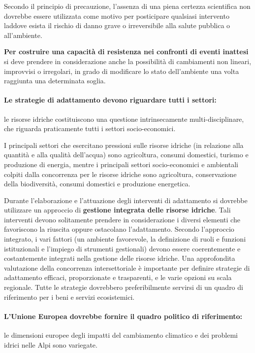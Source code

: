 \documentclass[14pt,a4paper]{article}
\begin{document}
		Secondo il principio di precauzione, l'assenza di una piena certezza scientifica non dovrebbe essere utilizzata come motivo per posticipare qualsiasi intervento laddove esista il rischio di danno grave o irreversibile alla salute pubblica o all'ambiente.
		
		\textbf{Per costruire una capacità di resistenza nei
		confronti di eventi inattesi} si deve prendere in
		considerazione anche la possibilità di cambiamenti
		non lineari, improvvisi o irregolari, in grado
		di modificare lo stato dell'ambiente una volta
		raggiunta una determinata soglia.
				
		
		\paragraph{Le strategie di adattamento devono riguardare tutti i settori:} le risorse idriche costituiscono una questione intrinsecamente multi-disciplinare, che riguarda
		praticamente tutti i settori socio-economici.
		
		I principali settori che esercitano pressioni sulle risorse idriche (in relazione alla quantità e alla qualità dell'acqua) sono agricoltura, consumi domestici, turismo e produzione di energia, mentre i principali settori socio-economici e ambientali colpiti dalla concorrenza per le risorse idriche sono agricoltura, conservazione della biodiversità, consumi domestici e produzione energetica.
		
		Durante l'elaborazione e l'attuazione degli interventi di adattamento si dovrebbe utilizzare un approccio di \textbf{gestione integrata delle risorse idriche}. Tali interventi devono solitamente prendere in considerazione i diversi elementi
		che favoriscono la riuscita oppure ostacolano l'adattamento. Secondo l'approccio integrato, i vari fattori (un ambiente favorevole, la definizione di ruoli e funzioni istituzionali e l'impiego di strumenti gestionali) devono essere coerentemente e costantemente integrati nella gestione delle
		risorse idriche. Una approfondita valutazione della concorrenza intersettoriale è importante per definire strategie di adattamento efficaci, proporzionate e trasparenti, e le varie opzioni su scala regionale. Tutte le strategie dovrebbero preferibilmente servirsi di un quadro di riferimento per i beni e servizi ecosistemici.
		
		\paragraph{L'Unione Europea dovrebbe fornire il quadro
		politico di riferimento:} le dimensioni europee degli impatti del cambiamento climatico e dei problemi idrici
		nelle Alpi sono variegate. 
		
\end{document}
